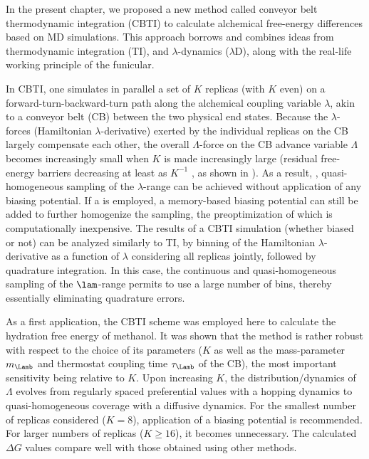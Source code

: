 In the present chapter, we proposed a new method called 
conveyor belt thermodynamic integration (CBTI)
to calculate alchemical free-energy differences based on 
MD simulations.
%
This approach borrows and combines ideas from
thermodynamic integration\cite{KI33.1,KI34.2,KI35.1} (TI),
and $\lambda$-dynamics\cite{KO96.1,DA01.7,GU03.1,KN09.1,KN11.2,DO11.2,AR15.2,HA17.1} ($\lambda$D),
along with the real-life working principle
of the funicular.
%

%
In CBTI, one simulates in parallel a set of $K$ 
 replicas
(with $K$ even) on a forward-turn-backward-turn 
path along the alchemical coupling variable $\lambda$, 
akin to a conveyor belt (CB) between the two physical end 
states.
%
Because the $\lambda$-forces (Hamiltonian $\lambda$-derivative)
exerted by the individual replicas on the CB largely 
compensate each other, the overall $\Lambda$-force on 
the CB advance variable $\Lambda$ becomes increasingly 
small when $K$ is made increasingly large (residual free-energy
barriers decreasing at least as $K^{-1}$ , as shown in ).
%
As a result, , quasi-homogeneous
sampling of the $\lambda$-range can be achieved
without application of any biasing potential.
%
If a  is employed, a memory-based biasing potential 
can still be added to further homogenize the sampling,
the preoptimization of which is computationally inexpensive.
%
The results of a CBTI simulation (whether biased or not) can be analyzed similarly to TI,
by binning of the  Hamiltonian $\lambda$-derivative as a function 
of $\lambda$ considering all replicas jointly, followed 
by quadrature integration. 
%
In this case, the continuous and quasi-homogeneous sampling of the $\lam$-range permits to use a large number of bins,
thereby essentially eliminating quadrature errors.

As a first application, 
the CBTI scheme was employed here to calculate the 
hydration free energy of methanol.
%
It was shown that the method is rather robust with respect 
to the choice of its parameters ($K$ as well as the mass-parameter $m_{\Lamb}$ and thermostat coupling time $\tau_\Lamb$ of the CB), the 
most important sensitivity being relative to $K$.
%
Upon increasing $K$, the distribution/dynamics of $\Lambda$ evolves 
from regularly spaced preferential values with a hopping dynamics
to quasi-homogeneous coverage with a diffusive dynamics.
%
For the smallest number of replicas considered ($K=8$), application 
of a biasing potential is recommended. For larger numbers of 
replicas ($K\ge 16$), it becomes unnecessary.
%
The calculated $\Delta G$ values compare well with those obtained using other methods.




